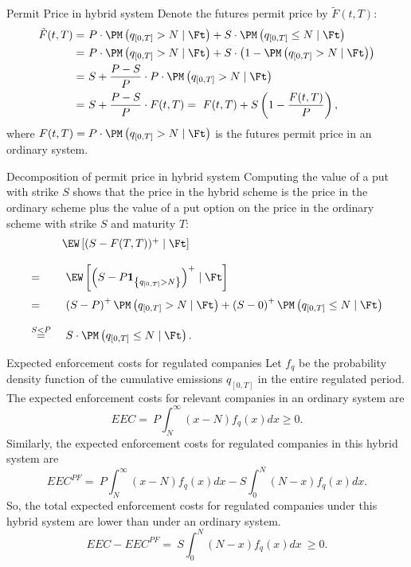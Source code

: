 
{Permit Price in hybrid system}
Denote the futures permit price by $\tilde{F}(t,T)$:
\begin{align*}
\tilde{F}(t,T) =& \ P \cdot \PM \left( q_{[0,T]} > N \mid \Ft \right) + S \cdot \PM \left( q_{[0,T]} \le N \mid \Ft \right) \\
  =& \ P \cdot \PM \left( q_{[0,T]} > N \mid \Ft \right) + S \cdot \left( 1 - \PM \left( q_{[0,T]} > N \mid \Ft \right)\right) \\
  =& \ S + \frac{P-S}{P} \cdot P \cdot \PM \left( q_{[0,T]} > N \mid \Ft \right) \\
  =& \ S + \frac{P-S}{P} \cdot F(t,T) = \ F(t,T) + S\left(1 - \frac{F(t,T)}{P}\right),
\end{align*}
where $F(t,T) = P \cdot \PM \left( q_{[0,T]} > N \mid \Ft \right)$ is the futures permit price in an ordinary system.

{Decomposition of permit price in hybrid system}
Computing the value of a put with strike $S$ shows that the price in the hybrid scheme is the price in the ordinary scheme plus the value of a put option on the price in the ordinary scheme with strike $S$ and maturity $T$:
$$
\begin{array}{ll}
&\EW\left[ (S-F(T,T))^+ \mid \Ft \right]\\*[12pt]
=& \ \EW\left[ \left( S- P \textbf{1}_{\left\{ q_{[0,T]} > N \right\}} \right)^+ \mid \Ft \right] \\*[12pt]
=& \ \left( S- P \right)^+ \PM \left( q_{[0,T]} > N \mid \Ft \right) + \left( S- 0 \right)^+ \PM \left( q_{[0,T]} \le N \mid \Ft \right) \\*[12pt]
 \stackrel{S<P}{=}& \ S \cdot \PM \left( q_{[0,T]} \le N \mid \Ft \right).
\end{array}
$$

{Expected enforcement costs for regulated companies}
 Let $f_q$ be the probability density function of the cumulative emissions $q_{[0,T]}$ in the entire regulated period. The expected enforcement costs for relevant companies in an ordinary system are
$$
EEC = \ P \int_N^{\infty} (x-N) f_q(x) dx \ge 0.
$$
Similarly, the expected enforcement costs for regulated companies in this hybrid system are
$$
EEC^{PF} = \ P \int_N^{\infty} (x-N) f_q(x) dx - S \int_0^N (N-x) f_q(x) dx.
$$
So, the total expected enforcement costs for regulated companies under this hybrid system are lower than under an ordinary system.
$$
EEC - EEC^{PF} = \ S \int_0^N (N-x) f_q(x) dx \ \ge 0.
$$

